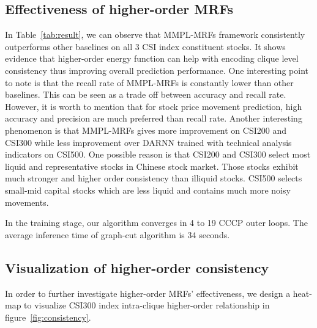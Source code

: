 \subsection{Effectiveness of higher-order MRFs}
In Table~\ref{tab:result}, we can observe that MMPL-MRFs
framework consistently outperforms other baselines on all 3 CSI
index constituent stocks. It shows evidence that higher-order
energy function can help with encoding clique level consistency
thus improving overall prediction performance. One interesting
point to note is that the recall rate of MMPL-MRFs is constantly
lower than other baselines. This can be seen as a trade off
between accuracy and recall rate. However, it is worth to mention
that for stock price movement prediction, high accuracy and
precision are much preferred than recall rate. Another
interesting phenomenon is that MMPL-MRFs gives more improvement
on CSI200 and CSI300 while less improvement over DARNN trained
with technical analysis indicators on CSI500. One possible reason
is that CSI200 and CSI300 select most liquid and representative
stocks in Chinese stock market. Those stocks exhibit much
stronger and higher order consistency than illiquid stocks.
CSI500 selects small-mid capital stocks which are less liquid and
contains much more noisy movements.

In the training stage, our algorithm converges in 4 to 19
CCCP outer loops. The average inference time of graph-cut
algorithm is 34 seconds.

\subsection{Visualization of higher-order consistency}

In order to further investigate higher-order MRFs' effectiveness,
we design a heat-map to visualize CSI300 index intra-clique
higher-order relationship in figure~\ref{fig:consistency}.

